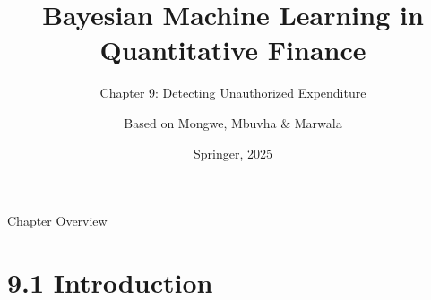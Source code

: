 \documentclass[aspectratio=169,10pt]{beamer}
\title[Bayesian ML in QF -- Ch.9]{Bayesian Machine Learning in Quantitative Finance}
\subtitle{Chapter 9: Detecting Unauthorized Expenditure}
\author{Based on Mongwe, Mbuvha \& Marwala}
\institute{Langevin and Hamiltonian Monte Carlo for Public-Finance Oversight}
\date{Springer, 2025}
\begin{document}
\begin{frame}
  \titlepage
\end{frame}

\begin{frame}{Chapter Overview}
  \tableofcontents
\end{frame}

\section{9.1 Introduction}
\end{document}

